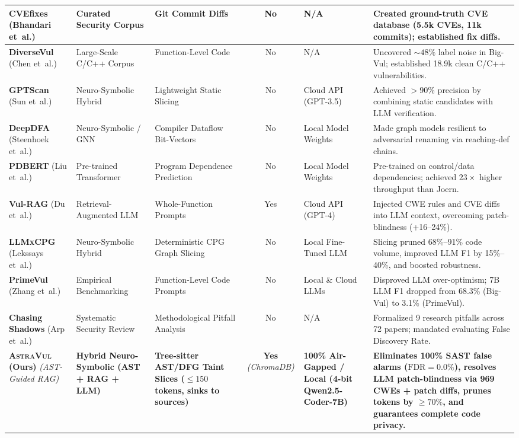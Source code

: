 \documentclass[10pt]{article}
\begin{document}
\begin{tabular}{|p{3.2cm}|p{3.2cm}|p{4.6cm}|c|p{3.2cm}|p{8.8cm}|}
\hline
\textbf{CVEfixes} (Bhandari et~al.) & Curated Security Corpus & Git Commit Diffs & No & N/A & Created ground-truth CVE database (5.5k CVEs, 11k commits); established fix diffs. \\
\hline
\textbf{DiverseVul} (Chen et~al.) & Large-Scale C/C++ Corpus & Function-Level Code & No & N/A & Uncovered $\sim 48\%$ label noise in Big-Vul; established 18.9k clean C/C++ vulnerabilities. \\
\hline
\textbf{GPTScan} (Sun et~al.) & Neuro-Symbolic Hybrid & Lightweight Static Slicing & No & Cloud API (GPT-3.5) & Achieved $>90\%$ precision by combining static candidates with LLM verification. \\
\hline
\textbf{DeepDFA} (Steenhoek et~al.) & Neuro-Symbolic / GNN & Compiler Dataflow Bit-Vectors & No & Local Model Weights & Made graph models resilient to adversarial renaming via reaching-def chains. \\
\hline
\textbf{PDBERT} (Liu et~al.) & Pre-trained Transformer & Program Dependence Prediction & No & Local Model Weights & Pre-trained on control/data dependencies; achieved $23\times$ higher throughput than Joern. \\
\hline
\textbf{Vul-RAG} (Du et~al.) & Retrieval-Augmented LLM & Whole-Function Prompts & Yes & Cloud API (GPT-4) & Injected CWE rules and CVE diffs into LLM context, overcoming patch-blindness (+16--24\%). \\
\hline
\textbf{LLMxCPG} (Lekssays et~al.) & Neuro-Symbolic Hybrid & Deterministic CPG Graph Slicing & No & Local Fine-Tuned LLM & Slicing pruned 68\%--91\% code volume, improved LLM F1 by 15\%--40\%, and boosted robustness. \\
\hline
\textbf{PrimeVul} (Zhang et~al.) & Empirical Benchmarking & Function-Level Code Prompts & No & Local \& Cloud LLMs & Disproved LLM over-optimism; 7B LLM F1 dropped from 68.3\% (Big-Vul) to 3.1\% (PrimeVul). \\
\hline
\textbf{Chasing Shadows} (Arp et~al.) & Systematic Security Review & Methodological Pitfall Analysis & No & N/A & Formalized 9 research pitfalls across 72 papers; mandated evaluating False Discovery Rate. \\
\hline
\hline
\textbf{\textsc{AstraVul} (Ours)} \newline \textit{(AST-Guided RAG)} & \textbf{Hybrid Neuro-Symbolic \newline (AST + RAG + LLM)} & \textbf{Tree-sitter AST/DFG Taint Slices \newline ($\le 150$ tokens, sinks to sources)} & \textbf{Yes} \newline \textit{(ChromaDB)} & \textbf{100\% Air-Gapped / Local \newline (4-bit Qwen2.5-Coder-7B)} & \textbf{Eliminates 100\% SAST false alarms ($\text{FDR}=0.0\%$), resolves LLM patch-blindness via 969 CWEs + patch diffs, prunes tokens by $\ge 70\%$, and guarantees complete code privacy.} \\
\hline
\end{tabular}
\end{document}
